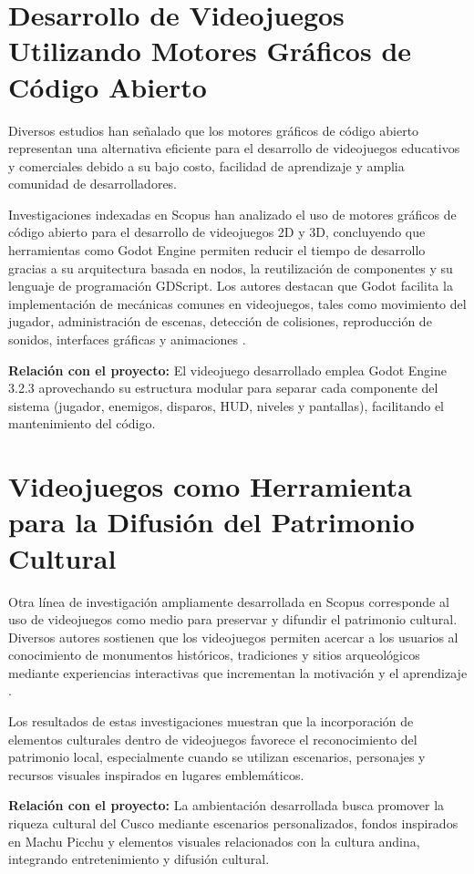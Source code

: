 \documentclass[12pt, a4paper, oneside]{report}
\begin{document}
\section{Desarrollo de Videojuegos Utilizando Motores Gráficos de Código Abierto}

Diversos estudios han señalado que los motores gráficos de código abierto representan una alternativa eficiente para el desarrollo de videojuegos educativos y comerciales debido a su bajo costo, facilidad de aprendizaje y amplia comunidad de desarrolladores.

Investigaciones indexadas en Scopus han analizado el uso de motores gráficos de código abierto para el desarrollo de videojuegos 2D y 3D, concluyendo que herramientas como Godot Engine permiten reducir el tiempo de desarrollo gracias a su arquitectura basada en nodos, la reutilización de componentes y su lenguaje de programación GDScript. Los autores destacan que Godot facilita la implementación de mecánicas comunes en videojuegos, tales como movimiento del jugador, administración de escenas, detección de colisiones, reproducción de sonidos, interfaces gráficas y animaciones \cite{godot_docs}.

\textbf{Relación con el proyecto:} El videojuego desarrollado emplea Godot Engine 3.2.3 aprovechando su estructura modular para separar cada componente del sistema (jugador, enemigos, disparos, HUD, niveles y pantallas), facilitando el mantenimiento del código.

\section{Videojuegos como Herramienta para la Difusión del Patrimonio Cultural}

Otra línea de investigación ampliamente desarrollada en Scopus corresponde al uso de videojuegos como medio para preservar y difundir el patrimonio cultural. Diversos autores sostienen que los videojuegos permiten acercar a los usuarios al conocimiento de monumentos históricos, tradiciones y sitios arqueológicos mediante experiencias interactivas que incrementan la motivación y el aprendizaje \cite{unesco}.

Los resultados de estas investigaciones muestran que la incorporación de elementos culturales dentro de videojuegos favorece el reconocimiento del patrimonio local, especialmente cuando se utilizan escenarios, personajes y recursos visuales inspirados en lugares emblemáticos.

\textbf{Relación con el proyecto:} La ambientación desarrollada busca promover la riqueza cultural del Cusco mediante escenarios personalizados, fondos inspirados en Machu Picchu y elementos visuales relacionados con la cultura andina, integrando entretenimiento y difusión cultural.
\end{document}
